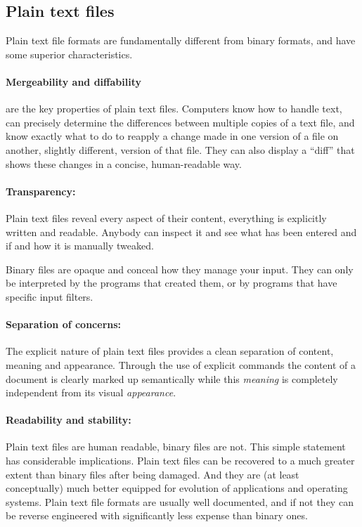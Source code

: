 \documentclass[11pt,a4paper]{article}
\begin{document}
\subsection{Plain text files}
Plain text file formats are fundamentally different from binary formats,
and have some superior characteristics.

\paragraph{Mergeability and diffability}
are the key properties of plain text files.  Computers know how to handle text,
can precisely determine the differences between multiple copies of a text file,
and know exactly what to do to reapply a change made in one version of a file
on another, slightly different, version of that file.
They can also display a “diff” that shows these changes in a concise, human-readable way.

\paragraph{Transparency:}
Plain text files reveal every aspect of their content, everything is explicitly written
and readable. Anybody can inspect it and see what has been entered and if and how it is
manually tweaked. 

Binary files are opaque and conceal how they manage your input. They can only be
interpreted by the programs that created them, or by programs that have specific input filters.

\paragraph{Separation of concerns:}
The explicit nature of plain text files provides a clean separation of content, meaning
and appearance. Through the use of explicit commands the content
of a document is clearly marked up semantically while this \emph{meaning} is completely
independent from its visual \emph{appearance}.

\paragraph{Readability and stability:}
Plain text files are human readable, binary files are not. This simple statement has
considerable implications. Plain text files can be recovered to a much greater extent
than binary files after being damaged. And they are (at least conceptually) much better
equipped for evolution of applications and operating systems. Plain text file formats are
usually well documented, and if not they can be reverse engineered with significantly
less expense than binary ones.
\end{document}
